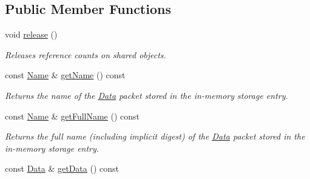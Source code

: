 \subsection*{Public Member Functions}
\begin{DoxyCompactItemize}
\item 
void \hyperlink{classndn_1_1util_1_1InMemoryStorageEntry_a6587a90fb9799751b6daca9276be982c}{release} ()\hypertarget{classndn_1_1util_1_1InMemoryStorageEntry_a6587a90fb9799751b6daca9276be982c}{}\label{classndn_1_1util_1_1InMemoryStorageEntry_a6587a90fb9799751b6daca9276be982c}

\begin{DoxyCompactList}\small\item\em Releases reference counts on shared objects. \end{DoxyCompactList}\item 
const \hyperlink{classndn_1_1Name}{Name} \& \hyperlink{classndn_1_1util_1_1InMemoryStorageEntry_a0c33a01c38887020430e085dcddd3af8}{get\+Name} () const\hypertarget{classndn_1_1util_1_1InMemoryStorageEntry_a0c33a01c38887020430e085dcddd3af8}{}\label{classndn_1_1util_1_1InMemoryStorageEntry_a0c33a01c38887020430e085dcddd3af8}

\begin{DoxyCompactList}\small\item\em Returns the name of the \hyperlink{classndn_1_1Data}{Data} packet stored in the in-\/memory storage entry. \end{DoxyCompactList}\item 
const \hyperlink{classndn_1_1Name}{Name} \& \hyperlink{classndn_1_1util_1_1InMemoryStorageEntry_a984325afc10d6b83b6dfe08e1bfb311d}{get\+Full\+Name} () const\hypertarget{classndn_1_1util_1_1InMemoryStorageEntry_a984325afc10d6b83b6dfe08e1bfb311d}{}\label{classndn_1_1util_1_1InMemoryStorageEntry_a984325afc10d6b83b6dfe08e1bfb311d}

\begin{DoxyCompactList}\small\item\em Returns the full name (including implicit digest) of the \hyperlink{classndn_1_1Data}{Data} packet stored in the in-\/memory storage entry. \end{DoxyCompactList}\item 
const \hyperlink{classndn_1_1Data}{Data} \& \hyperlink{classndn_1_1util_1_1InMemoryStorageEntry_a6bc75fec83c26a6f3b380ec8ad674242}{get\+Data} () const\hypertarget{classndn_1_1util_1_1InMemoryStorageEntry_a6bc75fec83c26a6f3b380ec8ad674242}{}\label{classndn_1_1util_1_1InMemoryStorageEntry_a6bc75fec83c26a6f3b380ec8ad674242}


\end{DoxyCompactItemize}
